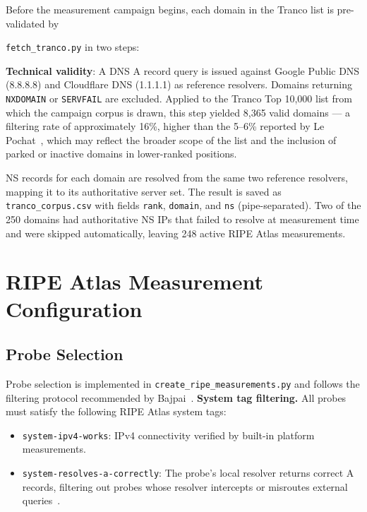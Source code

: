 Before the measurement campaign begins, each domain in the Tranco list is pre-validated by

\texttt{fetch\_tranco.py} in two steps:

\textbf{Technical validity}: A \ac{DNS} \ac{A} record query is issued against Google Public \ac{DNS} (8.8.8.8) and Cloudflare \ac{DNS} (1.1.1.1) as reference resolvers. Domains returning \texttt{NXDOMAIN} or \texttt{SERVFAIL} are excluded. Applied to the Tranco Top 10,000 list from which the campaign corpus is drawn, this step yielded 8,365 valid domains --- a filtering rate of approximately 16\%, higher than the 5--6\% reported by Le Pochat~\cite{LePochat2019}, which may reflect the broader scope of the list and the inclusion of parked or inactive domains in lower-ranked positions.

\ac{NS} records for each domain are resolved from the same two reference resolvers, mapping it to its authoritative server set. The result is saved as \texttt{tranco\_corpus.csv} with fields \texttt{rank}, \texttt{domain}, and \texttt{ns} (pipe-separated). Two of the 250 domains had authoritative \ac{NS} \ac{IP}s that failed to resolve at measurement time and were skipped automatically, leaving 248 active RIPE Atlas measurements.

\section{RIPE Atlas Measurement Configuration}
\label{sec:3.3}

\subsection{Probe Selection}
\label{subsec:3.3.1}

Probe selection is implemented in \texttt{create\_ripe\_measurements.py} and follows the filtering protocol recommended by Bajpai~\cite{Bajpai2017}. \textbf{System tag filtering.} All probes must satisfy the following RIPE Atlas system tags:

\begin{itemize}
  \item \texttt{system-ipv4-works}: \ac{IPv4} connectivity verified by built-in platform measurements.
  \item \texttt{system-resolves-a-correctly}: The probe's local resolver returns correct \ac{A} records, filtering out probes whose resolver intercepts or misroutes external queries~\cite{Boswell2024}.

\end{itemize}

